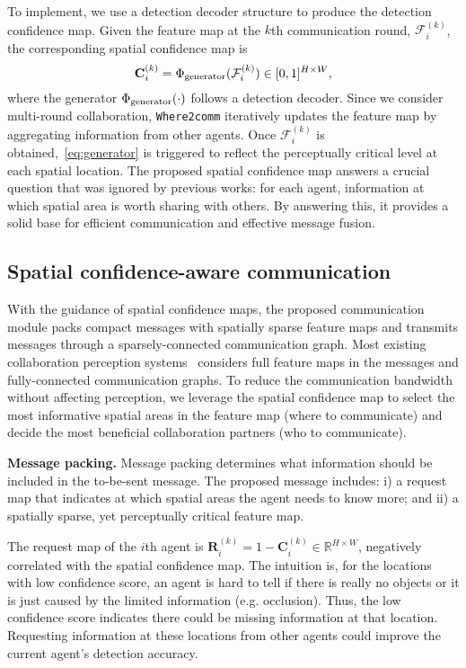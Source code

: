 \documentclass{article}
\begin{document}
To implement, we use a detection decoder structure to produce the detection confidence map. Given the feature map at the $k$th communication round, $\mathcal{F}_i^{(k)}$, the corresponding spatial confidence map is 
\vspace{-1mm}
\begin{equation}
\label{eq:generator}
    \mathbf{C}_i^{(k)}  =  \Phi_{\rm generator}(\mathcal{F}_i^{(k)})  \in [0,1]^{H \times W},
\end{equation}
where the generator $\Phi_{\rm generator}(\cdot)$ follows a detection decoder. Since we consider multi-round collaboration, \texttt{Where2comm} iteratively updates the feature map by aggregating information from other agents. Once $\mathcal{F}_i^{(k)}$ is obtained,~\eqref{eq:generator} is triggered to reflect the perceptually critical level at each spatial location. The proposed spatial confidence map answers a crucial question that was ignored by previous works: for each agent, information at which spatial area is worth sharing with others. By answering this, it provides a solid base for efficient communication and effective message fusion.

\vspace{-2mm}
\subsection{Spatial confidence-aware communication}
\label{sec:Comm}
\vspace{-2mm}
With the guidance of spatial confidence maps, the proposed communication module packs compact messages with spatially sparse feature maps and transmits messages through a sparsely-connected communication graph. Most existing collaboration perception systems~\cite{v2vnet,disconet,xu2022v2x} considers full feature maps in the messages and fully-connected communication graphs. To reduce the communication bandwidth without affecting perception, we leverage the spatial confidence map to select the most informative spatial areas in the feature map (where to communicate) and decide the most beneficial collaboration partners (who to communicate).

\textbf{Message packing.} Message packing determines what information should be included in the to-be-sent message. The proposed message includes: i) a request map that indicates at which spatial areas the agent needs to know more; and ii) a spatially sparse, yet perceptually critical feature map.

The request map of the $i$th agent is $\mathbf{R}_{i}^{(k)} = 1 - \mathbf{C}_{i}^{(k)} \in \mathbb{R}^{H\times W}$, negatively correlated with the spatial confidence map. The intuition is, for the locations with low confidence score, an agent is hard to tell if there is really no objects or it is just caused by the limited information (e.g. occlusion). Thus, the low confidence score indicates there could be missing information at that location. Requesting information at these locations from other agents could improve the current agent's detection accuracy.
\end{document}
